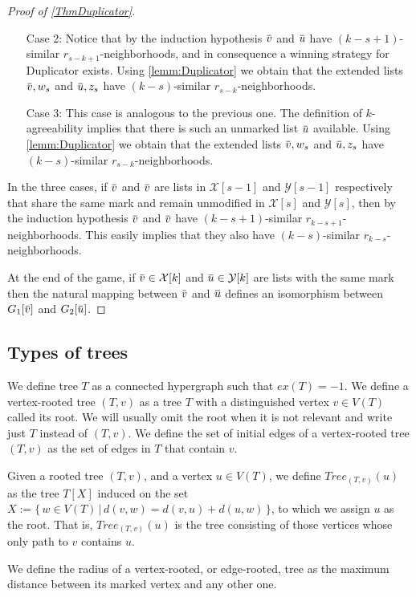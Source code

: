 \documentclass[12pt,notitlepage,a4paper]{article}
\theoremstyle{definition}
\newcommand{\overbar}[1]{\mkern 1.5mu\overline{\mkern-1.5mu#1\mkern-1.5mu}\mkern 1.5mu}
\begin{document}
\begin{proof}[Proof of \cref{ThmDuplicator}]
\begin{itemize}
		\item[Case 2:] Notice that by the induction hypothesis 
		$\overbar{v}$ and $\overbar{u}$ have $(k-s+1)$-similar
		$r_{s-k+1}$-neighborhoods, and in consequence a winning strategy
		for Duplicator exists. Using \cref{lemm:Duplicator} we obtain 
		that the extended lists $\overbar{v},w_s$ and $\overbar{u},z_s$
		have $(k-s)$-similar $r_{s-k}$-neighborhoods. 	
		
		\item[Case 3:] This case is analogous to the previous one.
		The definition of $k$-agreeability implies that there is 
		such an unmarked list $\overbar{u}$ available. Using \cref{lemm:Duplicator} 
		we obtain 
		that the extended lists $\overbar{v},w_s$ and $\overbar{u},z_s$
		have $(k-s)$-similar $r_{s-k}$-neighborhoods.	
	\end{itemize} 
	
	In the three cases, if $\overbar{v}$ and $\overbar{v}$
	are lists in $\mathcal{X}[s-1]$ and $\mathcal{Y}[s-1]$
	respectively that share the same mark and remain unmodified
	in $\mathcal{X}[s]$ and $\mathcal{Y}[s]$, then by the 
	induction hypothesis $\overbar{v}$ and $\overbar{v}$
	have $(k-s+1)$-similar $r_{k-s+1}$-neighborhoods. This
	easily implies that they also have
	$(k-s)$-similar $r_{k-s}$-neighborhoods.\par
	At the end of the game, if $\overbar{v}\in \mathcal{X}[k]$ and 
	$\overbar{u}\in \mathcal{Y}[k]$ are lists with the same mark
	then the natural mapping between $\overbar{v}$ and $\overbar{u}$
	defines an isomorphism between $G_1[\overbar{v}]$ and $G_2[\overbar{u}]$.
\end{proof}



\subsection{Types of trees}

We define tree $T$ as a connected hypergraph such that
$ex(T)=-1$. We define a vertex-rooted tree $(T,v)$ 
as a tree $T$ with a 
distinguished vertex $v\in V(T)$ called its root. We will
usually omit the root when it is not relevant and 
write just $T$ instead of $(T,v)$. We define the set
of initial edges of a vertex-rooted tree $(T,v)$ as the
set of edges in $T$ that contain $v$. \par
%
Given a rooted tree $(T, v)$, and a vertex $u\in V(T)$, 
we define $Tree_{(T,v)}(u)$ as the tree $T[X]$ induced on the
set $X:=\{ \, w\in V(T) \, | \, d(v,w)=d(v,u)+ d(u,w) \,  \}
$, to which we assign $u$ as the root.
That is, $Tree_{(T,v)}(u)$ is the tree consisting of those vertices
whose only path to $v$ contains $u$.
\par
We define the radius of a vertex-rooted, or edge-rooted,
tree as the maximum distance between its marked
vertex and any other one. \par
\end{document}
